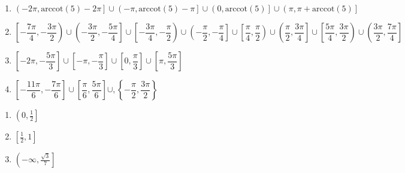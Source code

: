 \begin{enumerate}

\setcounter{enumi}{\value{HW}}

\item  $\left(-2\pi, \text{arccot}(5) - 2\pi\right] \cup \left(-\pi, \text{arccot}(5) - \pi\right] \cup \left(0, \text{arccot}(5)\right] \cup \left(\pi, \pi + \text{arccot}(5)\right]$

\item \scriptsize $\left[ -\dfrac{7\pi}{4}, -\dfrac{3\pi}{2} \right) \cup \left( -\dfrac{3\pi}{2}, -\dfrac{5\pi}{4} \right] \cup \left[ -\dfrac{3\pi}{4}, -\dfrac{\pi}{2} \right) \cup \left( -\dfrac{\pi}{2}, -\dfrac{\pi}{4} \right] \cup \left[ \dfrac{\pi}{4}, \dfrac{\pi}{2} \right) \cup \left( \dfrac{\pi}{2}, \dfrac{3\pi}{4} \right] \cup \left[ \dfrac{5\pi}{4}, \dfrac{3\pi}{2} \right) \cup \left( \dfrac{3\pi}{2}, \dfrac{7\pi}{4} \right]$ \normalsize

\item $\left[ -2\pi, -\dfrac{5\pi}{3} \right] \cup \left[ -\pi, -\dfrac{\pi}{3} \right] \cup \left[ 0, \dfrac{\pi}{3} \right] \cup \left[ \pi, \dfrac{5\pi}{3} \right]$

\item $\left[ -\dfrac{11\pi}{6},  -\dfrac{7\pi}{6} \right] \cup \left[ \dfrac{\pi}{6}, \dfrac{5\pi}{6} \right] \cup, \left\{ -\dfrac{\pi}{2}, \dfrac{3\pi}{2} \right\}$

\setcounter{HW}{\value{enumi}}

\end{enumerate}


\begin{multicols}{3}

\begin{enumerate}

\setcounter{enumi}{\value{HW}}

\item $\left(0, \frac{1}{2}\right]$ \vphantom{$\left(-\infty, \frac{\sqrt{3}}{7} \right]$}
\item $\left[\frac{1}{2}, 1\right]$ \vphantom{$\left(-\infty, \frac{\sqrt{3}}{7} \right]$}
\item $\left(-\infty, \frac{\sqrt{3}}{7} \right]$

\setcounter{HW}{\value{enumi}}

\end{enumerate}

\end{multicols}

